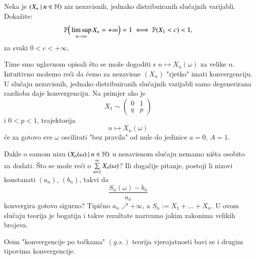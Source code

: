 \begin{zad} \label{zad:11.11}
    Neka je $({X_n} \: | \: {n \in \mathbb{N}})$ niz nezavisnih, jednako distribuiranih slu\v cajnih varijabli.
    Doka\v zite:
    \begin{equation*}
        \mathbb{P} \Big( \limsup\limits_{n \to \infty} X_n  = +\infty \Big) = 1 \iff \mathbb{P}({X_1 < c}) < 1,
    \end{equation*}
    za svaki $0 < c < +\infty$.
\end{zad}

\begin{nap} \label{nap:11.12}
    Time smo uglavnom opisali \v sto se mo\v ze dogoditi s $n \mapsto X_n(\omega)$ za velike $n$.
    Intuitivno mo\v zemo re\' ci da \' cemo za nezavisne $(X_n)$ "rjetko" imati konvergenciju.
    U slu\v caju nezavisnih, jednako distribuiranih slu\v cajnih varijabli samo degenerirana razdioba daje konvergenciju.
    Na primjer ako je
    \begin{equation*}
        X_1 \sim
        \begin{pmatrix}
            0 & 1\\
            q & p
        \end{pmatrix}
    \end{equation*}
    i $0 < p < 1$, trajektorija
    \begin{equation*}
        n \mapsto X_n(\omega)
    \end{equation*}
    \' ce za gotovo sve $\omega$ oscilirati "bez pravila" od nule do jedinice $a = 0$, $A = 1$.

    Dakle o samom nizu $({X_n (\omega)} \: | \: {n \in \mathbb{N}})$ u nezavisnom slu\v caju nemamo ni\v sta osobito za dodati.
    \v Sto se mo\v ze re\' ci o $\sum\limits_{n = 1}^{\infty} X_n (\omega)$?
    Ili duga\v cije pitanje, postoji li nizovi konstanati $(a_n)$, $(b_n)$, takvi da
    \begin{equation*}
        \frac{S_n(\omega) - b_n}{a_n}
    \end{equation*}
    konvergira gotovo sigurno?
    Tipi\v cno $a_n \nearrow +\infty$, a $S_n := X_1 + \ldots + X_n$.
    U ovom slu\v caju teorija je bogatija i takve rezultate nazivamo jakim zakonima velikih brojeva.
\end{nap}

Osim "konvergencije po to\v ckama" $(g.s.)$ teorija vjerojatnosti bavi se i drugim tipovima konvergencije.

